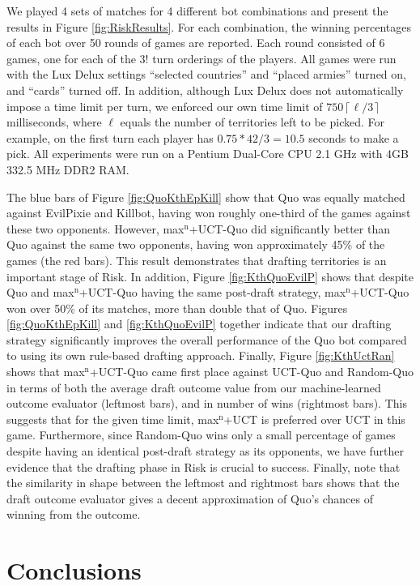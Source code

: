 \documentclass[letterpaper]{article}
\numberwithin{equation}{section}
\numberwithin{theorem}{section}
\numberwithin{lemma}{section}
\numberwithin{df}{section}
\begin{document}
We played 4 sets of matches for 4 different bot combinations and present the results in Figure \ref{fig:RiskResults}.  For each combination, the winning percentages of each bot over 50 rounds of games are reported.  Each round consisted of 6 games, one for each of the $3!$ turn orderings of the players.  All games were run with the Lux Delux settings ``selected countries'' and ``placed armies'' turned on, and ``cards'' turned off.  In addition, although Lux Delux does not automatically impose a time limit per turn, we enforced our own time limit of $750 \left \lceil \ell / 3 \right \rceil$ milliseconds, where $\ell$ equals the number of territories left to be picked.  For example, on the first turn each player has $0.75 * 42 / 3 = 10.5$ seconds to make a pick.  All experiments were run on a Pentium Dual-Core CPU 2.1 GHz with 4GB 332.5 MHz DDR2 RAM.  

The blue bars of Figure \ref{fig:QuoKthEpKill} show that Quo was equally matched against EvilPixie and Killbot, having won roughly one-third of the games against these two opponents.  However, max$^\text{n}$+UCT-Quo did significantly better than Quo against the same two opponents, having won approximately 45\% of the games (the red bars).  This result demonstrates that drafting territories is an important stage of Risk.  In addition, Figure \ref{fig:KthQuoEvilP} shows that despite Quo and max$^\text{n}$+UCT-Quo having the same post-draft strategy, max$^\text{n}$+UCT-Quo won over 50\% of its matches, more than double that of Quo.  Figures \ref{fig:QuoKthEpKill} and \ref{fig:KthQuoEvilP} together indicate that our drafting strategy significantly improves the overall performance of the Quo bot compared to using its own rule-based drafting approach.  Finally, Figure \ref{fig:KthUctRan} shows that max$^\text{n}$+UCT-Quo came first place against UCT-Quo and Random-Quo in terms of both the average draft outcome value from our machine-learned outcome evaluator (leftmost bars), and in number of wins (rightmost bars).  This suggests that for the given time limit, max$^\text{n}$+UCT is preferred over UCT in this game.  Furthermore, since Random-Quo wins only a small percentage of games despite having an identical post-draft strategy as its opponents, we have further evidence that the drafting phase in Risk is crucial to success.  Finally, note that the similarity in shape between the leftmost and rightmost bars shows that the draft outcome evaluator gives a decent approximation of Quo's chances of winning from the outcome.

\section{Conclusions}
\end{document}
